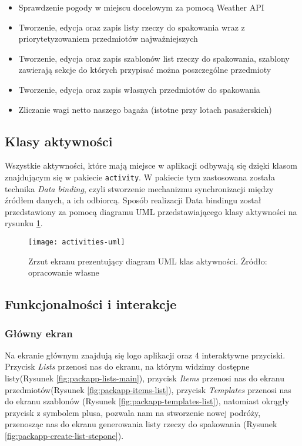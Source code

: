\documentclass[a4paper,12pt]{article}
\newcommand{\imagewidth}{1.0}
\begin{document}
\begin{itemize}
		\item Sprawdzenie pogody w miejscu docelowym za pomocą Weather API
		\item Tworzenie, edycja oraz zapis listy rzeczy do spakowania wraz z priorytetyzowaniem przedmiotów najważniejszych
		\item Tworzenie, edycja oraz zapis szablonów list rzeczy do spakowania, szablony zawierają sekcje do których przypisać można poszczególne przedmioty
		\item Tworzenie, edycja oraz zapis własnych przedmiotów do spakowania
		\item Zliczanie wagi netto naszego bagaża (istotne przy lotach pasażerskich)
\end{itemize}

\subsection{Klasy aktywności}

Wszystkie aktywności, które mają miejsce w aplikacji odbywają się dzięki klasom znajdującym się w pakiecie \texttt{activity}. W pakiecie tym zastosowana została technika \textit{Data binding}, czyli stworzenie mechanizmu synchronizacji między źródłem danych, a ich odbiorcą. Sposób realizacji Data bindingu został przedstawiony za pomocą diagramu UML przedstawiającego klasy aktywności na rysunku \ref{fig:activities-uml}.

\begin{figure}[H]
    \centering
    \texttt{[image: activities-uml]}
    \caption{Zrzut ekranu prezentujący diagram UML klas aktywności. Źródło: opracowanie własne}
    \label{fig:activities-uml}
\end{figure}

\subsection{Funkcjonalności i interakcje}

\subsubsection{Główny ekran}

Na ekranie głównym znajdują się logo aplikacji oraz 4 interaktywne przyciski. Przycisk \textit{Lists} przenosi nas do ekranu, na którym widzimy dostępne listy(Rysunek \ref{fig:packapp-lists-main}), przycisk \textit{Items} przenosi nas do ekranu przedmiotów(Rysunek \ref{fig:packapp-items-list}), przycisk \textit{Templates} przenosi nas do ekranu szablonów  (Rysunek \ref{fig:packapp-templates-list}), natomiast okrągły przycisk z symbolem plusa, pozwala nam na stworzenie nowej podróży, przenosząc nas do ekranu generowania listy rzeczy do spakowania (Rysunek \ref{fig:packapp-create-list-stepone}).
\end{document}
